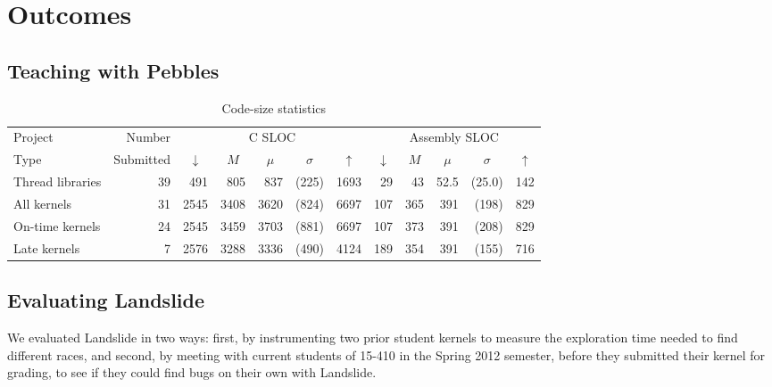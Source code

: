\section{Outcomes}

\subsection{Teaching with Pebbles}


\newcommand{\mathcols}{\multicolumn{1}{c}{$\downarrow$} & \multicolumn{1}{c}{$M$} & \multicolumn{1}{c}{$\mu$} & \multicolumn{1}{c}{$\sigma$} & \multicolumn{1}{c|}{$\uparrow$} }

\begin{table*}[htb]
\fontsize{9}{12}\selectfont
\centering
\begin{tabular}{|l|r||r r r r r|r r r r r|} 
\hline
Project   & Number    & \multicolumn{5}{c|}{C SLOC} & \multicolumn{5}{c|}{Assembly SLOC} \\
Type      & Submitted & \mathcols              & \mathcols                     \\
\hline
\hline
Thread libraries & 39 &  491 &  805 &  837 & (225) & 1693   &  29 &  43 & 52.5 & (25.0) & 142 \\
\hline
All kernels      & 31 & 2545 & 3408 & 3620 & (824) & 6697   & 107 & 365 &  391 & (198) & 829 \\
\hline
On-time kernels  & 24 & 2545 & 3459 & 3703 & (881) & 6697   & 107 & 373 &  391 & (208) & 829 \\
\hline
Late kernels     &  7 & 2576 & 3288 & 3336 & (490) & 4124   & 189 & 354 &  391 & (155) & 716 \\
\hline
\end{tabular}
\caption{Code-size statistics}
\label{table:sizes}
\end{table*}

\subsection{Evaluating Landslide}

We evaluated Landslide in two ways: first, by instrumenting two prior student kernels to measure the exploration time needed to find different races, and second, by meeting with current students of 15-410 in the Spring 2012 semester, before they submitted their kernel for grading, to see if they could find bugs on their own with Landslide.

